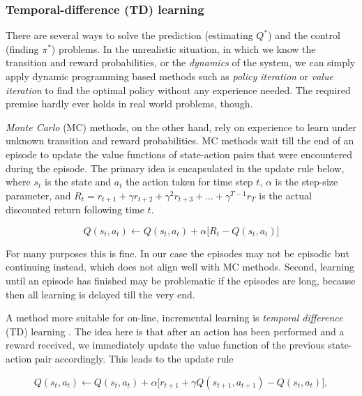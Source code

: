\documentclass{article} %
\begin{document}
\subsubsection{Temporal-difference (TD) learning}

There are several ways to solve the prediction (estimating $Q^*$) and the
control (finding $\pi^*$) problems. In the unrealistic situation, in which we
know the transition and reward probabilities, or the \emph{dynamics} of the
system, we can simply apply dynamic programming based methods such as
\emph{policy iteration} or \emph{value iteration} to find the optimal policy
without any experience needed. The required premise hardly ever holds in real
world problems, though.

\emph{Monte Carlo} (MC) methods, on the other hand, rely on experience to learn
under unknown transition and reward probabilities. MC methods wait till the end
of an episode to update the value functions of state-action pairs that were
encountered during the episode. The primary idea is encapsulated in the update
rule below, where $s_t$ is the state and $a_t$ the action taken for time step
$t$, $\alpha$ is the step-size parameter, and $R_t = r_{t+1} + \gamma r_{t+2} +
\gamma^2 r_{t+3} + ... + \gamma^{T-1} r_{T}$ is the actual discounted return
following time $t$.

\begin{equation}\label{eq:mc}
  Q(s_t, a_t) \leftarrow
  Q(s_t, a_t) + \alpha \big[ R_t - Q(s_t, a_t)\big]
\end{equation}

For many purposes this is fine. In our case the episodes may not be episodic
but continuing instead, which does not align well with MC methods. Second,
learning until an episode has finished may be problematic if the episodes are
long, because then all learning is delayed till the very end.

A method more suitable for on-line, incremental learning is \emph{temporal
difference} (TD) learning \cite{sutton1988learning}. The idea here is that
after an action has been performed and a reward received, we immediately update
the value function of the previous state-action pair accordingly. This leads to
the update rule

\begin{equation}\label{eq:td}
  Q(s_t, a_t) \leftarrow
  Q(s_t, a_t) + \alpha \big[ r_{t+1} + \gamma Q(s_{t+1}, a_{t+1})
  - Q(s_t, a_t)\big],
\end{equation}
\end{document}
